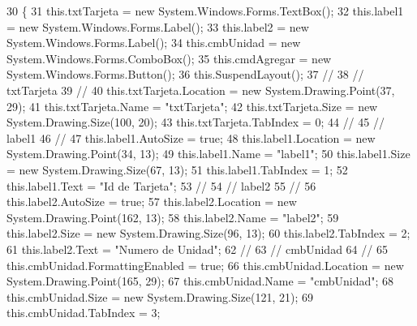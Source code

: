 \begin{DoxyCode}
30         \{
31             this.txtTarjeta = \textcolor{keyword}{new} System.Windows.Forms.TextBox();
32             this.label1 = \textcolor{keyword}{new} System.Windows.Forms.Label();
33             this.label2 = \textcolor{keyword}{new} System.Windows.Forms.Label();
34             this.cmbUnidad = \textcolor{keyword}{new} System.Windows.Forms.ComboBox();
35             this.cmdAgregar = \textcolor{keyword}{new} System.Windows.Forms.Button();
36             this.SuspendLayout();
37             \textcolor{comment}{// }
38             \textcolor{comment}{// txtTarjeta}
39             \textcolor{comment}{// }
40             this.txtTarjeta.Location = \textcolor{keyword}{new} System.Drawing.Point(37, 29);
41             this.txtTarjeta.Name = \textcolor{stringliteral}{"txtTarjeta"};
42             this.txtTarjeta.Size = \textcolor{keyword}{new} System.Drawing.Size(100, 20);
43             this.txtTarjeta.TabIndex = 0;
44             \textcolor{comment}{// }
45             \textcolor{comment}{// label1}
46             \textcolor{comment}{// }
47             this.label1.AutoSize = \textcolor{keyword}{true};
48             this.label1.Location = \textcolor{keyword}{new} System.Drawing.Point(34, 13);
49             this.label1.Name = \textcolor{stringliteral}{"label1"};
50             this.label1.Size = \textcolor{keyword}{new} System.Drawing.Size(67, 13);
51             this.label1.TabIndex = 1;
52             this.label1.Text = \textcolor{stringliteral}{"Id de Tarjeta"};
53             \textcolor{comment}{// }
54             \textcolor{comment}{// label2}
55             \textcolor{comment}{// }
56             this.label2.AutoSize = \textcolor{keyword}{true};
57             this.label2.Location = \textcolor{keyword}{new} System.Drawing.Point(162, 13);
58             this.label2.Name = \textcolor{stringliteral}{"label2"};
59             this.label2.Size = \textcolor{keyword}{new} System.Drawing.Size(96, 13);
60             this.label2.TabIndex = 2;
61             this.label2.Text = \textcolor{stringliteral}{"Numero de Unidad"};
62             \textcolor{comment}{// }
63             \textcolor{comment}{// cmbUnidad}
64             \textcolor{comment}{// }
65             this.cmbUnidad.FormattingEnabled = \textcolor{keyword}{true};
66             this.cmbUnidad.Location = \textcolor{keyword}{new} System.Drawing.Point(165, 29);
67             this.cmbUnidad.Name = \textcolor{stringliteral}{"cmbUnidad"};
68             this.cmbUnidad.Size = \textcolor{keyword}{new} System.Drawing.Size(121, 21);
69             this.cmbUnidad.TabIndex = 3;

\end{DoxyCode}
